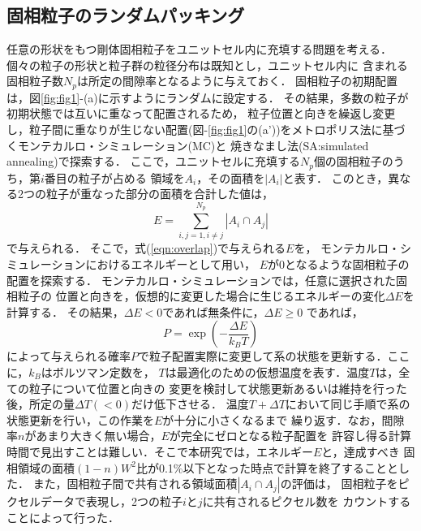 \subsection{固相粒子のランダムパッキング}
任意の形状をもつ剛体固相粒子をユニットセル内に充填する問題を考える．
個々の粒子の形状と粒子群の粒径分布は既知とし，ユニットセル内に
含まれる固相粒子数$N_p$は所定の間隙率となるように与えておく．
固相粒子の初期配置は，図\ref{fig:fig1}-(a)に示すようにランダムに設定する．
その結果，多数の粒子が初期状態では互いに重なって配置されるため，
粒子位置と向きを繰返し変更し，粒子間に重なりが生じない配置(図-\ref{fig:fig1}の(a'))をメトロポリス法に基づくモンテカルロ・シミュレーション(MC)\cite{comp_phys}と
焼きなまし法(SA:simulated annealing)で探索する．
ここで，ユニットセルに充填する$N_p$個の固相粒子のうち，第$i$番目の粒子が占める
領域を$A_i$，その面積を$\left| A_i \right|$と表す．
このとき，異なる2つの粒子が重なった部分の面積を合計した値は，
\begin{equation}
	E=\sum_{i,j=1, i\neq j}^{N_p} \left| A_i\cap A_j \right|
	\label{eqn:overlap}
\end{equation}
で与えられる． そこで，式(\ref{eqn:overlap})で与えられる$E$を，
モンテカルロ・シミュレーションにおけるエネルギーとして用い，
$E$が0となるような固相粒子の配置を探索する．
モンテカルロ・シミュレーションでは，任意に選択された固相粒子の
位置と向きを，仮想的に変更した場合に生じるエネルギーの変化$\Delta E$を計算する．
その結果，$\Delta E<0$であれば無条件に，$\Delta E \geq 0$
であれば，
\begin{equation}
	P=\exp\left( -\frac{\Delta E}{k_BT}\right)
	\label{eqn:Boltzmann}
\end{equation}
によって与えられる確率$P$で粒子配置実際に変更して系の状態を更新する．ここに，$k_B$はボルツマン定数を，
$T$は最適化のための仮想温度を表す．温度$T$は，全ての粒子について位置と向きの
変更を検討して状態更新あるいは維持を行った後，所定の量$\Delta T(<0)$だけ低下させる．
温度$T+\Delta T$において同じ手順で系の状態更新を行い，この作業を$E$が十分に小さくなるまで
繰り返す．なお，間隙率$n$があまり大きく無い場合，$E$が完全にゼロとなる粒子配置を
許容し得る計算時間で見出すことは難しい．そこで本研究では，エネルギー$E$と，達成すべき
固相領域の面積$(1-n)W^2$比が0.1$\%$以下となった時点で計算を終了することとした．
また，固相粒子間で共有される領域面積$\left| A_i \cap A_j \right|$の評価は，
固相粒子をピクセルデータで表現し，2つの粒子$i$と$j$に共有されるピクセル数を
カウントすることによって行った．
